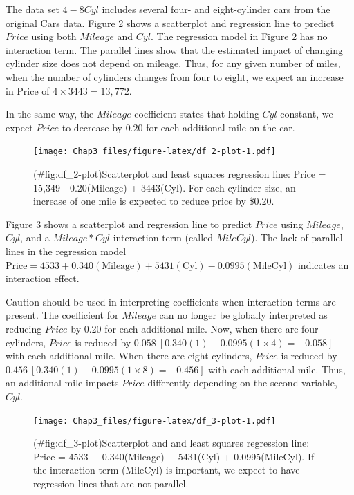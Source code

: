 \documentclass[
]{report}
\begin{document}
The data set \(4-8Cyl\) includes several four- and eight-cylinder cars from the original Cars data. Figure 2 shows a scatterplot and regression line to predict \(Price\) using both \(Mileage\) and \(Cyl\). The regression model in Figure 2 has no interaction term. The parallel lines show that the estimated impact of changing cylinder size does not depend on mileage. Thus, for any given number of miles, when the number of cylinders changes from four to eight, we expect an increase in Price of \(4 \times 3443 = 13{,}772\).

In the same way, the \(Mileage\) coefficient states that holding \(Cyl\) constant, we expect \(Price\) to decrease by \(0.20\) for each additional mile on the car.

\begin{figure}
\centering
\texttt{[image: Chap3\_files/figure-latex/df\_2-plot-1.pdf]}
\caption{(\#fig:df\_2-plot)Scatterplot and least squares regression line: Price = 15,349 - 0.20(Mileage) + 3443(Cyl). For each cylinder size, an increase of one mile is expected to reduce price by \$0.20.}
\end{figure}

Figure 3 shows a scatterplot and regression line to predict \(Price\) using \(Mileage\), \(Cyl\), and a \(Mileage*Cyl\) interaction term (called \(MileCyl\)). The lack of parallel lines in the regression model \(\text{Price} = 4533 + 0.340(\text{Mileage}) + 5431(\text{Cyl}) - 0.0995(\text{MileCyl})\) indicates an interaction effect.

Caution should be used in interpreting coefficients when interaction terms are present. The coefficient for \(Mileage\) can no longer be globally interpreted as reducing \(Price\) by \(0.20\) for each additional mile. Now, when there are four cylinders, \(Price\) is reduced by \(0.058\ [0.340(1) - 0.0995(1 \times 4) = -0.058]\) with each additional mile. When there are eight cylinders, \(Price\) is reduced by \(0.456\ [0.340(1) - 0.0995(1 \times 8) = -0.456]\) with each additional mile. Thus, an additional mile impacts \(Price\) differently depending on the second variable, \(Cyl\).

\begin{figure}
\centering
\texttt{[image: Chap3\_files/figure-latex/df\_3-plot-1.pdf]}
\caption{(\#fig:df\_3-plot)Scatterplot and and least squares regression line: Price = 4533 + 0.340(Mileage) + 5431(Cyl) + 0.0995(MileCyl). If the interaction term (MileCyl) is important, we expect to have regression lines that are not parallel.}
\end{figure}
\end{document}
